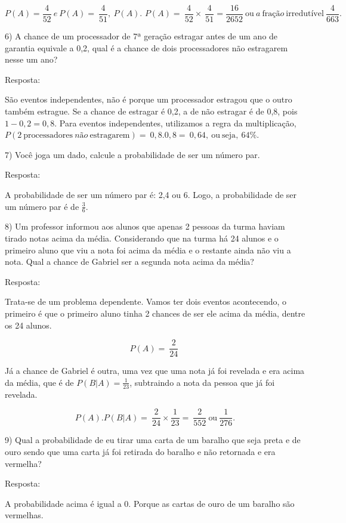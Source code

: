 \[P\left( A \right) = \frac{4}{52}\ e\ P\left( A \right) = \ \frac{4}{51},\ P\left( A \right)\text{.\ }P\left( A \right) = \ \frac{4}{52} \times \ \frac{4}{51} = \frac{16}{2652}\ \text{ou}\ a\ \text{fra}ção\ \text{irredut}í\text{vel}\ \frac{4}{663}.\]

6) A chance de um processador de 7ª geração estragar antes de um ano de
garantia equivale a 0,2, qual é a chance de dois processadores não
estragarem nesse um ano?

Resposta:

São eventos independentes, não é porque um processador estragou que o
outro também estrague. Se a chance de estragar é 0,2, a de não estragar
é de 0,8, pois \(1 - 0,2 = 0,8\). Para eventos independentes, utilizamos
a regra da multiplicação,
\(P(2\ \text{processad}\text{ores}\ não\ \text{estragarem}) = \ 0,8.0,8 = \ 0,64,\ \text{ou}\ \text{seja},\ 64\%.\)

7) Você joga um dado, calcule a probabilidade de ser um número par.

Resposta:

A probabilidade de ser um número par é: 2,4 ou 6. Logo, a probabilidade
de ser um número par é de \(\frac{3}{6}\).

8) Um professor informou aos alunos que apenas 2 pessoas da turma haviam
tirado notas acima da média. Considerando que na turma há 24 alunos e o
primeiro aluno que viu a nota foi acima da média e o restante ainda não
viu a nota. Qual a chance de Gabriel ser a segunda nota acima da média?

Resposta:

Trata-se de um problema dependente. Vamos ter dois eventos acontecendo,
o primeiro é que o primeiro aluno tinha 2 chances de ser ele acima da
média, dentre os 24 alunos.

\[P(A) = \ \frac{2}{24}\ \]

Já a chance de Gabriel é outra, uma vez que uma nota já foi revelada e
era acima da média, que é de \(P(B|A) = \frac{1}{23}\), subtraindo a
nota da pessoa que já foi revelada.

\[P(A).P(B|A) = \ \frac{2}{24} \times \frac{1}{23} = \ \frac{2}{552}\ \text{ou}\ \frac{1}{276}.\]

9) Qual a probabilidade de eu tirar uma carta de um baralho que seja
preta e de ouro sendo que uma carta já foi retirada do baralho e não
retornada e era vermelha?

Resposta:

A probabilidade acima é igual a 0. Porque as cartas de ouro de um
baralho são vermelhas.

